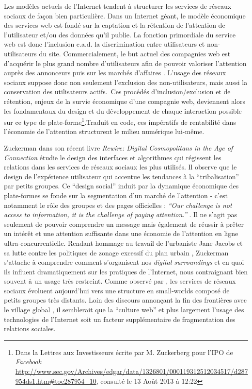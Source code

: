 Les modèles actuels de l’Internet tendent à structurer les services de réseaux sociaux de façon bien particulière. Dans un Internet géant, le modèle économique des services web est fondé sur la captation et la rétention de l'attention de l'utilisateur et/ou des données qu'il publie. La fonction primordiale du service web est donc l'inclusion c.a.d. la discrimination entre utilisateurs et non-utilisateurs du site. Commercialement, le but actuel des compagnies web est d'acquérir le plus grand nombre d'utilisateurs afin de pouvoir valoriser l’attention auprès des annonceurs puis sur les marchés d’affaires \citep{Ries2011}. L'usage des réseaux sociaux suppose donc non seulement l'exclusion des non-utilisateurs, mais aussi la conservation des utilisateurs actifs. Ces procédés d'inclusion/exclusion et de rétention, enjeux de la survie économique d'une compagnie web, deviennent alors les fondamentaux du design et du développement de chaque interaction possible sur ce type de plate-forme\footnote{Dans la Lettres aux Investisseurs écrite par M. Zuckerberg  pour l’IPO de \textit{Facebook} \url{http://www.sec.gov/Archives/edgar/data/1326801/000119312512034517/d287954ds1.htm\#toc287954_10}, consulté le 13 Août 2013 à 12:22}.Traduit en code, ces impératifs de rentabilité dans l’économie de l’attention structurent le milieu numérique lui-même.

Zuckerman dans son récent livre \textit{Rewire: Digital Cosmopolitans in the Age of Connection} étudie le design des interfaces et algorithmes qui régissent les relations dans les services de réseaux sociaux les plus utilisés. Il observe que le design de l’expérience utilisateur qui accentue les tendances à la ``tribalisation'' par petits groupes. Ce ``design social'' induit par la dynamique économique des plate-formes se fonde sur la segmentation d’un marché de l’attention - c’est notamment le rôle des groupes et des pages officielles : \textit{``Our challenge is not access to information, it is the challenge of paying attention.''} \cite{Zuckerman2013}. Il ne s’agit pas seulement de pouvoir comprendre un message mais également de réussir à prêter un intérêt et une attention suffisante dans une économie de l’attention en ligne ultra-concurrentielle. Rendant hommage au travail de l’urbaniste Jane Jacobs et sa lutte contre les politiques de zonage excessif du plan urbain \citep{Jacobs1961}, Zuckerman s’attache à comprendre comment s’organisent nos \textit{digital surroundings} et en quoi ils influent dramatiquement sur les pratiques de l’Internet, nous contraignant bien souvent à un usage très restreint. Comme observé par \cite{Kumar2006}, les services de réseaux sociaux évoluent aujourd’hui vers une structure en small-worlds composé de petits groupes très distants. Loin des discours annonçant la fin des frontières avec le village global \citep{Breton1997}, il semblerait que la ``culture web'' et plus largement l’usage des technologies de l’Internet soit un facteur supplémentaire de fragmentation des relations sociales. 


